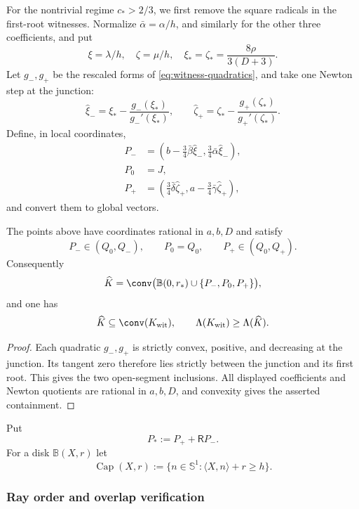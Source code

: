 For the nontrivial regime $c_*>2/3$, we first remove the square radicals in
the first-root witnesses.  Normalize
$\bar\alpha=\alpha/h$, and similarly for the other three coefficients, and
put
\[
 \xi=\lambda/h,\quad \zeta=\mu/h,\quad
 \xi_*=\zeta_*=\frac{8\rho}{3(D+3)}.
\]
Let $g_-,g_+$ be the rescaled forms of
\eqref{eq:witness-quadratics}, and take one Newton step at the junction:
\[
 \widehat\xi_-=\xi_*-\frac{g_-(\xi_*)}{g_-'(\xi_*)},\qquad
 \widehat\zeta_+=\zeta_*-\frac{g_+(\zeta_*)}{g_+'(\zeta_*)}.
\]
Define, in local coordinates,
\begin{align*}
 P_-&=\left(b-\frac34\bar\beta\widehat\xi_-,
          \frac34\bar\alpha\widehat\xi_-\right),\\
 P_0&=J,\\
 P_+&=\left(\frac34\bar\delta\widehat\zeta_+,
          a-\frac34\bar\gamma\widehat\zeta_+\right),
\end{align*}
and convert them to global vectors.

\begin{lemma}
\label{lem:technical-newton-reduction}
The points above have coordinates rational in $a,b,D$ and satisfy
\[
 P_-\in(Q_0,Q_-),\qquad P_0=Q_0,\qquad P_+\in(Q_0,Q_+).
\]
Consequently
\[
 \widehat K=\conv\bigl(\mathbb B(0,r_*)\cup\{P_-,P_0,P_+\}\bigr),
\]
and one has
\begin{equation}
 \widehat K\subseteq\conv(K_{\rm wit}),
 \qquad
 \Lambda(K_{\rm wit})\ge\Lambda(\widehat K).
 \label{eq:reader-newton-reduction}
\end{equation}
\end{lemma}

\begin{proof}
Each quadratic $g_-,g_+$ is strictly convex, positive, and decreasing at
the junction.  Its tangent zero therefore lies strictly between the
junction and its first root.  This gives the two open-segment inclusions.
All displayed coefficients and Newton quotients are rational in $a,b,D$,
and convexity gives the asserted containment.
\end{proof}

Put
\[
 P_*:=P_++\mathsf R P_-.
\]
For a disk $\mathbb B(X,r)$ let
\[
 \operatorname{Cap}(X,r)
 :=\{n\in\mathbb S^1:\langle X,n\rangle+r\ge h\}.
\]


\subsubsection*{Ray order and overlap verification}

